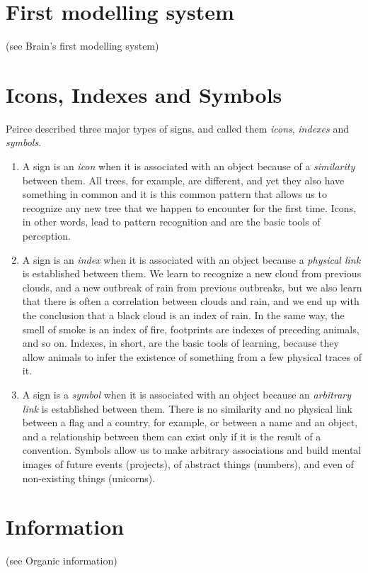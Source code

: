 \documentclass[12pt]{article}
\begin{document}
\section{First modelling system} (see Brain's first modelling system)


\section{Icons, Indexes and Symbols}
Peirce described three major types of signs, and called them \textit{icons}, \textit{indexes} and \textit{symbols}.
\begin{enumerate}
\item A sign is an \textit{icon} when it is associated with an object because of a \textit{similarity} between them. All trees, for example, are different, and yet they also have something in common and it is this common pattern that allows us to recognize any new tree that we happen to encounter for the first time. Icons, in other words, lead to pattern recognition and are the basic tools of perception. 

\item A sign is an \textit{index} when it is associated with an object because a \textit{physical link} is established between them. We learn to recognize a new cloud from previous clouds, and a new outbreak of rain from previous outbreaks, but we also learn that there is often a correlation between clouds and rain, and we end up with the conclusion that a black cloud is an index of rain. In the same way, the smell of smoke is an index of fire, footprints are indexes of preceding animals, and so on. Indexes, in short, are the basic tools of learning, because they allow animals to infer the existence of something from a few physical traces of it.

\item A sign is a \textit{symbol} when it is associated with an object because an \textit{arbitrary link} is established between them. There is no similarity and no physical link between a flag and a country, for example, or between a name and an object, and a relationship between them can exist only if it is the result of a convention. Symbols allow us to make arbitrary associations and build mental images of future events (projects), of abstract things (numbers), and even of non-existing things (unicorns). 
\end{enumerate}


\section{Information} (see Organic information) 
\end{document}
